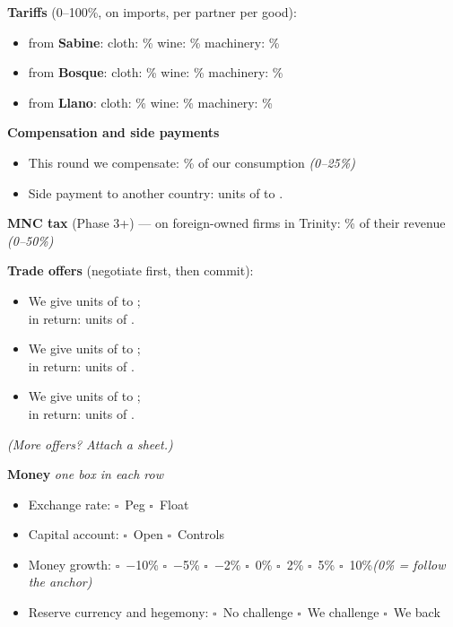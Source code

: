 \documentclass[11pt]{article}
\newcommand{\blank}[1]{\underline{\hspace{#1}}}
\newcommand{\boxx}{$\square$}
\begin{document}
{\bfseries Tariffs} (0--100\%, on imports, per partner per good):\par
\begin{itemize}[nosep,leftmargin=1.4em]
  \item from \textbf{Sabine}: \quad cloth: \blank{1.4cm}\% \quad wine: \blank{1.4cm}\% \quad machinery: \blank{1.4cm}\%
  \item from \textbf{Bosque}: \quad cloth: \blank{1.4cm}\% \quad wine: \blank{1.4cm}\% \quad machinery: \blank{1.4cm}\%
  \item from \textbf{Llano}: \quad cloth: \blank{1.4cm}\% \quad wine: \blank{1.4cm}\% \quad machinery: \blank{1.4cm}\%
\end{itemize}

{\bfseries Compensation and side payments}\par
\begin{itemize}[nosep,leftmargin=1.4em]
  \item This round we compensate: \blank{1.4cm}\% of our consumption \quad \textit{(0--25\%)}
  \item Side payment to another country: \blank{1.6cm} units of \blank{2cm} to \blank{2.2cm}.
\end{itemize}

{\bfseries MNC tax} (Phase 3+) --- on foreign-owned firms in Trinity: \blank{1.4cm}\% of their revenue \quad \textit{(0--50\%)}\par

{\bfseries Trade offers} (negotiate first, then commit):\par
\begin{itemize}[itemsep=4pt,leftmargin=1.4em]
  \item We give \blank{1.8cm} units of \blank{2.2cm} to \blank{2.2cm};\\[2pt] in return: \blank{1.8cm} units of \blank{2.2cm}.
  \item We give \blank{1.8cm} units of \blank{2.2cm} to \blank{2.2cm};\\[2pt] in return: \blank{1.8cm} units of \blank{2.2cm}.
  \item We give \blank{1.8cm} units of \blank{2.2cm} to \blank{2.2cm};\\[2pt] in return: \blank{1.8cm} units of \blank{2.2cm}.
\end{itemize}
\textit{(More offers? Attach a sheet.)}

{\bfseries Money} \hfill \textit{one box in each row}\par
\begin{itemize}[nosep,leftmargin=1.4em]
  \item Exchange rate: \quad \boxx\ Peg \quad \boxx\ Float
  \item Capital account: \quad \boxx\ Open \quad \boxx\ Controls
  \item Money growth: \quad \boxx\ $-$10\% \quad \boxx\ $-$5\% \quad \boxx\ $-$2\% \quad \boxx\ 0\% \quad \boxx\ 2\% \quad \boxx\ 5\% \quad \boxx\ 10\%\newline \textit{(0\% = follow the anchor)}
  \item Reserve currency and hegemony: \quad \boxx\ No challenge \quad \boxx\ We challenge \quad \boxx\ We back \blank{2.2cm}
\end{itemize}
\end{document}
